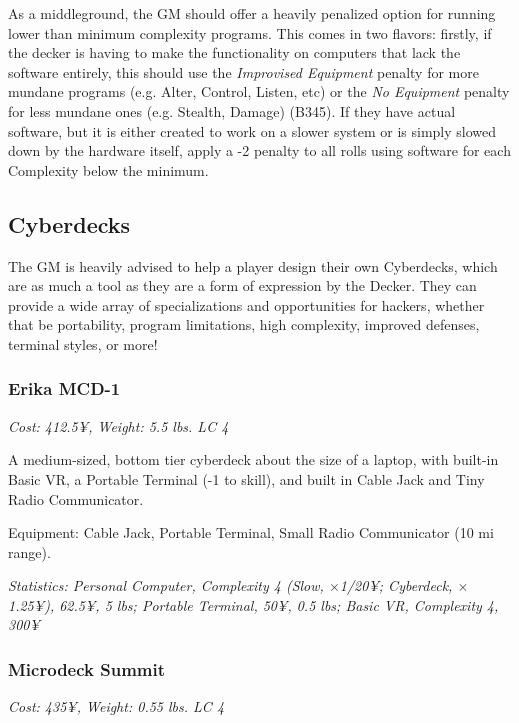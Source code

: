\begin{multicols}{3}
	As a middleground, the GM should offer a heavily penalized option for running lower than minimum complexity programs. This comes in two flavors: firstly, if the decker is having to make the functionality on computers that lack the software entirely, this should use the \textit{Improvised Equipment} penalty for more mundane programs (e.g. Alter, Control, Listen, etc) or the \textit{No Equipment} penalty for less mundane ones (e.g. Stealth, Damage) (B345). If they have actual software, but it is either created to work on a slower system or is simply slowed down by the hardware itself, apply a -2 penalty to all rolls using software for each Complexity below the minimum.
	
	\subsection{Cyberdecks}
	
	The GM is heavily advised to help a player design their own Cyberdecks, which are as much a tool as they are a form of expression by the Decker. They can provide a wide array of specializations and opportunities for hackers, whether that be portability, program limitations, high complexity, improved defenses, terminal styles, or more!
	
	\subsubsection*{Erika MCD-1}
	
	\textit{\textcolor{NavyBlue}{Cost: 412.5¥, Weight: 5.5 lbs. LC 4}}
	
	A medium-sized, bottom tier cyberdeck about the size of a laptop, with built-in Basic VR, a Portable Terminal (-1 to skill), and built in Cable Jack and Tiny Radio Communicator.
	
	Equipment: Cable Jack, Portable Terminal, Small Radio Communicator (10 mi range).
	
	\textit{\textcolor{OliveGreen}{Statistics: Personal Computer, Complexity 4 (Slow, \(\times\)1/20¥; Cyberdeck, \(\times\)1.25¥), 62.5¥, 5 lbs; Portable Terminal, 50¥, 0.5 lbs; Basic VR, Complexity 4, 300¥}}
	
	\subsubsection*{Microdeck Summit}
	
	\textit{\textcolor{NavyBlue}{Cost: 435¥, Weight: 0.55 lbs. LC 4}}
	

\end{multicols}
